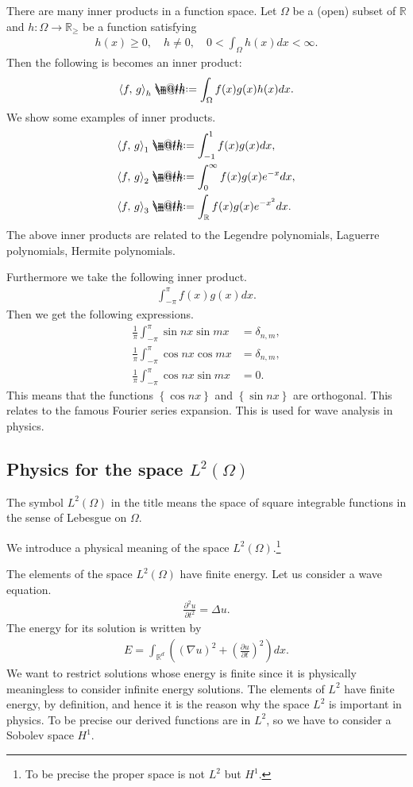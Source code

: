 \documentclass[openany, a4paper, oneside]{book}
\makeatletter
\newcommand*{\defeq}{\mathrel{\rlap{%
\raisebox{0.3ex}{$\m@th\cdot$}}%
\raisebox{-0.3ex}{$\m@th\cdot$}}%
=}
\theoremstyle{break}
\theoremstyle{breakdefn}
\newcommand{\rbk}[1]{\left (#1\right)}
\newcommand{\cbk}[1]{\left\{#1\right\}}
\newcommand{\bkt}[2]{\left\langle#1,\,#2\right\rangle}
\newcommand{\bbR}{\mathbb{R}}
\makeatother
\begin{document}
There are many inner products in a function space.
Let $\Omega$ be a (open) subset of $\bbR$ and $h \colon \Omega \to \bbR_{\geq}$ be a function satisfying
\begin{align}
 h(x) \geq 0, \quad
 h \neq 0, \quad
 0 < \int_\Omega h(x) dx < \infty.
\end{align}
Then the following is becomes an inner product:
\begin{align}
 \bkt{f}{g}_{h}
 \defeq
 \int_{\Omega} f(x) g(x) h(x) dx.
\end{align}
We show some examples of inner products.
\begin{align}
 \bkt{f}{g}_1
 &\defeq
 \int_{-1}^{1} f(x) g(x) dx, \\
 \bkt{f}{g}_2
 &\defeq
 \int_{0}^{\infty} f(x) g(x) e^{-x} dx, \\
 \bkt{f}{g}_3
 &\defeq
 \int_{\bbR} f(x) g(x) e^{-x^2} dx.
\end{align}
The above inner products are related to
the Legendre polynomials, Laguerre polynomials, Hermite polynomials.

Furthermore we take the following inner product.
\begin{align}
 \int_{- \pi}^{\pi} f(x) g(x) dx.
\end{align}
Then we get the following expressions.
\begin{align}
 \frac{1}{\pi} \int_{-\pi}^{\pi} \sin nx \sin mx
 &=
 \delta_{n,m}, \\
 \frac{1}{\pi} \int_{-\pi}^{\pi} \cos nx \cos mx
 &=
 \delta_{n,m}, \\
 \frac{1}{\pi} \int_{-\pi}^{\pi} \cos nx \sin mx
 &= 0.
\end{align}
This means that the functions $\cbk{\cos nx}$ and $\cbk{\sin nx}$ are orthogonal.
This relates to the famous Fourier series expansion.
This is used for wave analysis in physics.
\subsection{Physics for the space $L^2 \rbk{\Omega}$}
\label{sec-4-1-3-4}

The symbol $L^2 \rbk{\Omega}$ in the title means
the space of square integrable functions in the sense of Lebesgue on $\Omega$.

We introduce a physical meaning of the space $L^2 \rbk{\Omega}$.\footnote{To be precise the proper space is not $L^2$ but $H^1$.
 }

The elements of the space $L^2 \rbk{\Omega}$ have finite energy.
Let us consider a wave equation.
\begin{align}
 \frac{\partial^2 u}{\partial t^2}
 =
 \Delta u.
\end{align}
The energy for its solution is written by
\begin{align}
 E
 =
 \int_{\mathbb{R}^d} \rbk{\rbk{\nabla u}^2 + \rbk{\frac{\partial u}{\partial t}}^2}dx.
\end{align}
We want to restrict solutions whose energy is finite
since it is physically meaningless to consider infinite energy solutions.
The elements of $L^2$ have finite energy, by definition,
and hence it is the reason why the space $L^2$ is important in physics.
To be precise our derived functions are in $L^2$, so
we have to consider a Sobolev space $H^1$.
\end{document}
